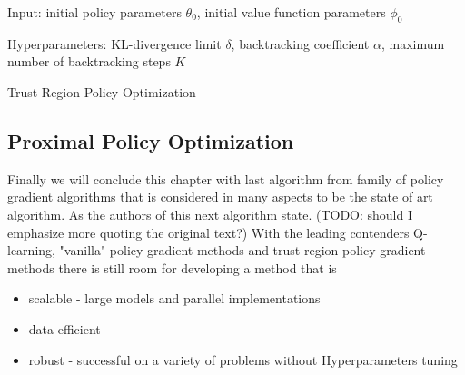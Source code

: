 \begin{algorithm}[H]
  Input: initial policy parameters $\theta_0$, initial value function parameters $\phi_0$

  Hyperparameters: KL-divergence limit $\delta$, backtracking coefficient $\alpha$, maximum number of backtracking steps $K$
  
  
  \caption{Trust Region Policy Optimization}
  \label{TRPO}
\end{algorithm}


\subsection{Proximal Policy Optimization}
Finally we will conclude this chapter with last algorithm from family of policy gradient algorithms that is considered in many aspects to be the state of art algorithm.
As the authors of this next algorithm state. (TODO: should I emphasize more quoting the original text?)
With the leading contenders Q-learning, "vanilla" policy gradient methods and trust region policy gradient methods there is still room for developing a method that is 
\begin{itemize}{}{}
  \item scalable - large models and parallel implementations
  \item data efficient
  \item robust - successful on a variety of problems without Hyperparameters tuning
\end{itemize}


